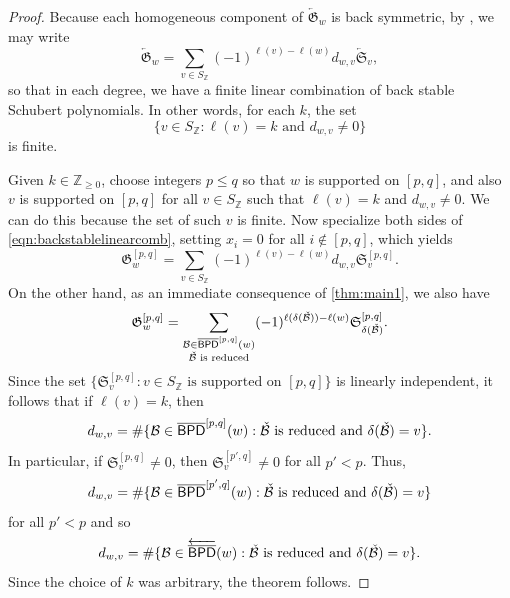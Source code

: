 \documentclass[12 pt]{amsart}
\numberwithin{equation}{section}
\theoremstyle{remark}
\newcommand{\kbpd}{\overline{\sf BPD}}
\newcommand{\demprod}{\delta}
\begin{document}
		\begin{proof}
			Because each homogeneous component of $\overleftarrow{\mathfrak{G}}_w$ is back symmetric, by \cite[Theorem~3.5]{Lam.Lee.Shimozono}, we may write 
			\begin{equation}
				\label{eqn:backstablelinearcomb}
				\overleftarrow{\mathfrak{G}}_w = \sum_{v \in S_{\mathbb{Z}}} (-1)^{\ell(v)-\ell(w)} d_{w,v}\overleftarrow{\mathfrak{S}}_v,
			\end{equation} 
			so that in each degree, we have a finite linear combination of back stable Schubert polynomials. 
			In other words, for each $k$, the set 
			\[\{v\in S_{\mathbb Z}:\ell(v) = k \text{ and } d_{w,v} \neq 0\}\]
			is finite. 
			
			Given $k\in \mathbb Z_{\geq 0}$, choose integers $p \leq q$ so that $w$ is supported on $[p,q]$, and also $v$ is supported on $[p,q]$ for all $v\in S_{\mathbb Z}$ such that $\ell(v)=k$ and $d_{w,v}\neq 0$. We can do this because the set of such $v$ is finite.
			Now specialize both sides of \cref{eqn:backstablelinearcomb}, setting $x_i = 0$ for all $i\notin [p,q]$, which yields
			\[\mathfrak{G}_w^{[p,q]} = \sum_{v \in S_{\mathbb{Z}}} (-1)^{\ell(v)-\ell(w)}d_{w,v} \mathfrak{S}^{[p,q]}_v.\]
			On the other hand, as an immediate consequence of \cref{thm:main1}, we also have
			\[\mathfrak{G}_w^{[p,q]} = \sum_{\substack{\mathcal{B} \in \kbpd^{[p,q]}(w)\\ \check{\mathcal{B}} \text{ is reduced}}} (-1)^{\ell(\demprod(\check{\mathcal{B}}))-\ell(w)} \mathfrak{S}^{[p,q]}_{\demprod(\check{\mathcal{B}})}.\]
			Since the set $\{\mathfrak{S}_v^{[p,q]}: v\in S_{\mathbb Z} \text{ is supported on } [p,q]\}$ is linearly independent, it follows that if $\ell(v)=k$, then 
			\[d_{w,v} = \#\{\mathcal{B} \in \kbpd^{[p,q]}(w) : \check{\mathcal{B}} \text{ is reduced and } \demprod(\check{\mathcal{B}}) = v\}.\]
			In particular, if $\mathfrak{S}^{[p,q]}_v \neq 0$, then $\mathfrak{S}^{[p',q]}_v \neq 0$ for all $p' < p$. Thus,
			\[d_{w,v} = \#\{\mathcal{B} \in \kbpd^{[p',q]}(w) : \check{\mathcal{B}} \text{ is reduced and } \demprod(\check{\mathcal{B}}) = v\}\]
			for all $p'<p$ and so
			\[d_{w,v} = \#\{\mathcal{B} \in \overleftarrow{\kbpd}(w) : \check{\mathcal{B}} \text{ is reduced and } \demprod(\check{\mathcal{B}}) = v\}.\]
			Since the choice of $k$ was arbitrary, the theorem follows.
		\end{proof}
		
\end{document}
